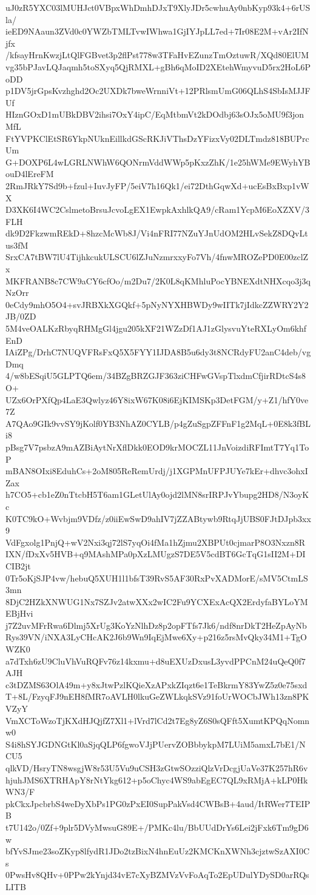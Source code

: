 uJ0zR5YXC03lMUHJct0VBpxWhDmhDJxT9XlyJDr5cwhuAy0nbKyp93k4+6rUSla/
ieED9NAaun3ZVd0c0YWZbTMLTvwIWhwa1GjIYJpLL7ed+7Ir08E2M+vAr2IfNjfx
/kfsayHrnKwzjLtQlFGBvet3p2flPst778w3TFaHvEZunzTmOztuwR/XQd80ElUM
vg35bPJavLQJaqmh5toSXyq5QjRMXL+gBh6qMoID2XEtehWmyvuD5rx2HoL6PoDD
p1DV5jrGpsKvzhghd2Oc2UXDk7bweWrnniVt+12PRlsmUmG06QLhS4SbIsMJJFUf
HIznGOxD1mUBkDBV2ihsi7OxY4ipC/EqMtbmVt2kDOdbj63sOJx5oMU9f3jonMfL
FtYVPKClEtSR6YkpNUknEillkdGScRKJiVThsDzYFizxVy02DLTmdz818BUPrcUm
G+DOXP6L4wLGRLNWhW6QONrmVddWWp5pKxzZhK/1e25hWMe9EWyhYBouD4lEreFM
2RmJRkY7Sd9b+fzul+IuvJyFP/5eiV7h16Qk1/ei72DthGqwXd+ucEsBxBxp1vWX
D3XK6I4WC2CslmetoBrsuJcvoLgEX1EwpkAxhlkQA9/cRam1YcpM6EoXZXV/3FLH
dk9D2FkzwmREkD+8hzcMcWb8J/Vi4nFRI77NZuYJnUdOM2HLvSekZ8DQvLtus3fM
SrxCA7tBW7lU4TijhkcukULSCU6lZJuNzmrxxyFo7Vh/4fnwMROZePD0E00zclZx
MKFRANB8c7CW9aCY6cfOo/m2Du7/2K0L8qKMhluPocYBNEXdtNHXcqo3j3qNzOrr
0eCdy9mhO5O4+svJRBXkXGQkf+5pNyNYXHBWDy9wIITk7jIdkcZZWRY2Y2JB/0ZD
5M4veOALKzRbyqRHMgGl4jgu205kXF21WZzDf1AJ1zGlysvuYteRXLyOm6khfEnD
IAiZPg/DrhC7NUQVFRsFxQ5X5FYY1IJDA8B5u6dy3t8NCRdyFU2anC4deb/vgDmq
4/w8bESqiU5GLPTQ6em/34BZgBRZGJF363ziCHFwGVspTlxdmCfjirRDtcS4s8O+
UZx6OrPXfQp4LaE3Qwlyz46Y8ixW67K08i6EjKIMSKp3DetFGM/y+Z1/hfY0ve7Z
A7QAo9GIk9vvSY9jKolf0YB3NhAZ0CYLB/p4gZuSgpZFFnF1g2MqL+0E8k3fBLi8
pBsg7V7psbzA9mAZBiAytNrXflDkk0EOD9krMOCZL11JnVoizdiRFImtT7Yq1ToP
mBAN8OIxi8EduhCs+2oM805ReRemUrdj/j1XGPMnUFPJUYe7kEr+dhvc3ohxIZax
h7CO5+cb1eZ0nTtcbH5T6am1GLetUlAy0ojd2lMN8srIRPJvYbupg2HD8/N3oyKc
K0TC9kO+Wvbjm9VDfz/z0iiEwSwD9ahIV7jZZABtywb9RtqJjUBS0FJtDJpb3xx9
VdFgxolg1PnjQ+wV2Nxi3qj72lS7yqOi4fMa1hZjmu2XBPUt0cjmarP8O3Nxzn8R
IXN/fDxXv5HVB+q9MAshMPa0pXzLMUgzS7DE5V5cdBT6GcTqG1sII2M+DICIB2jt
0Tr5oKjSJP4vw/hebuQ5XUH1l1bfsT39RvS5AF30RxPvXADMorE/sMV5CtmLS3mn
8DjC2HZkXNWUG1Nx7SZJv2atwXXx2wIC2Fu9YCXExAcQX2ErdyfaBYLoYMEBjHvi
j7Z2uvMFrRwa6Dlmj5XrUg3KoYzNlhDz8p2opFTfs7Jk6/ndf8nrDkT2HeZpAyNb
Rys39VN/iNXA3LyCHcAK2J6b9Wn9IqEjMwe6Xy+p216z5rsMvQky34M1+TgOWZK0
a7dTxh6zU9CluVhVuRQFv76z14kxmu+d8uEXUzDxusL3yvdPPCnM24uQeQ0f7AJH
c3tDZMS63OlA49m+y8xJtwPzlKQieXzAPxkZIqzt6e1TeBkrmY83YwZ5z0e75sxd
T+8L/FzyqFJ9nEH8fMR7oAVLH0lkuGeZWLkqkSVz91foUrWOCbJWh13zn8PKVZyY
VmXCToWzoTjKXdHJQjfZ7Xl1+lVrd7lCd2t7Eg8yZ6S0sQFft5XumtKPQqNomnw0
S4i8hSYJGDNGtKl0aSjqQLP6fgwoVJjPUervZOBbbykpM7LUiM5amxL7bE1/NCU5
qlkVD/HsryTN8wsgjW8r53U5Vu9uCSH3zGtwSOzziQlzVrDcgjUaVe37K257hR6v
hjuhJMS6XTRHApY8rNtYkg612+p5oChyc4WS9abEgEC7QL9xRMjA+kLP0HkWN3/F
pkCkxJpcbrbS4weDyXbPs1PG0zPxEI0SupPakVsd4CWBsB+4aud/ItRWer7TEIPB
t7U142o/0Zf+9plr5DVyMwsuG89E+/PMKc4lu/BbUUdDrYs6Lei2jFxk6Tm9gD6w
bfYvSJme23soZKyp8lfydR1JDo2tzBixN4hnEuUz2KMCKnXWNh3cjztwSzAXI0Cs
0PwsHv8QHv+0PPw2kYnjd34vE7cXyBZMVzVvFoAqTo2EpUDulYDySD0arRQsLITB
